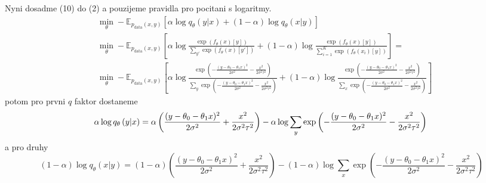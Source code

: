 \documentclass[a4paper, 11pt]{article}
\begin{document}
Nyni dosadme (10) do (2) a pouzijeme pravidla pro pocitani s logaritmy.
\begin{align}\label{q1q2final}
	&\min_{\theta}- \mathbb{E}_{p_{\mathrm{data}}(x,y)}\left[\alpha\log q_{\theta}\left(y|x\right)+ \left(1-\alpha\right)\log q_{\theta}\left(x|y\right) \right]  \\
&\min_{\theta}- \mathbb{E}_{p_{\mathrm{data}}(x,y)}\left[\alpha\log \frac{\exp\left({f_\theta\left(x\right)[y]}\right)}{\sum_{y'}\exp\left({f_\theta\left(x\right)[y']}\right)}+ \left(1-\alpha\right)\log \frac{\exp\left({f_\theta\left(x\right)[y]}\right)}{\sum_{i=1}^K\exp\left({f_\theta\left(x_i\right)[y]}\right)} \right] =\\
& \min_{\theta}- \mathbb{E}_{p_{\mathrm{data}}(x,y)}\left[\alpha\log \frac{\exp\left({-\frac{(y-\theta_0-\theta_1x)^2}{2\sigma^2} - \frac{x^2}{2\sigma^2\tau^2}}\right)}{\sum_{y}\exp\left({-\frac{(y-\theta_0-\theta_1x)^2}{2\sigma^2} - \frac{x^2}{2\sigma^2\tau^2}}\right)}+ \left(1-\alpha\right)\log \frac{\exp\left({-\frac{(y-\theta_0-\theta_1x)^2}{2\sigma^2} - \frac{x^2}{2\sigma^2\tau^2}}\right)}{\sum_{x}\exp\left({-\frac{(y-\theta_0-\theta_1x)^2}{2\sigma^2} - \frac{x^2}{2\sigma^2\tau^2}}\right)} \right] 
\end{align}
potom pro prvni $q$ faktor dostaneme 
\begin{equation}
\alpha\log q_{\theta}\left(y|x\right) = \alpha \left(\frac{(y-\theta_0-\theta_1x)^2}{2\sigma^2} + \frac{x^2}{2\sigma^2\tau^2}\right) -\alpha\log \sum_{y}\exp\left({-\frac{(y-\theta_0-\theta_1x)^2}{2\sigma^2} - \frac{x^2}{2\sigma^2\tau^2}}\right)\\ 
\end{equation}
a pro druhy
\begin{equation}
\left(1-\alpha\right)\log q_{\theta}\left(x|y\right) = (1-\alpha) \left(\frac{(y-\theta_0-\theta_1x)^2}{2\sigma^2} + \frac{x^2}{2\sigma^2\tau^2}\right) - (1-\alpha)\log \sum_{x}\exp\left({-\frac{(y-\theta_0-\theta_1x)^2}{2\sigma^2} - \frac{x^2}{2\sigma^2\tau^2}}\right)
\end{equation}
\end{document}
